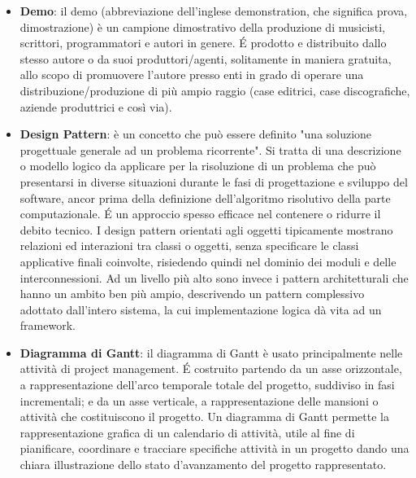 \begin{itemize}
\item[] \textbf{Demo}: il demo (abbreviazione dell'inglese demonstration, che significa prova, dimostrazione) è un campione dimostrativo della produzione di musicisti, scrittori, programmatori e autori in genere. \'E prodotto e distribuito dallo stesso autore o da suoi produttori/agenti, solitamente in maniera gratuita, allo scopo di promuovere l'autore presso enti in grado di operare una distribuzione/produzione di più ampio raggio (case editrici, case discografiche, aziende produttrici e così via).
\item[] \textbf{Design Pattern}: è un concetto che può essere definito "una soluzione progettuale generale ad un problema ricorrente". Si tratta di una descrizione o modello logico da applicare per la risoluzione di un problema che può presentarsi in diverse situazioni durante le fasi di progettazione e sviluppo del software, ancor prima della definizione dell'algoritmo risolutivo della parte computazionale. \'E un approccio spesso efficace nel contenere o ridurre il debito tecnico. I design pattern orientati agli oggetti tipicamente mostrano relazioni ed interazioni tra classi o oggetti, senza specificare le classi applicative finali coinvolte, risiedendo quindi nel dominio dei moduli e delle interconnessioni. Ad un livello più alto sono invece i pattern architetturali che hanno un ambito ben più ampio, descrivendo un pattern complessivo adottato dall'intero sistema, la cui implementazione logica dà vita ad un framework.
\item[] \textbf{Diagramma di Gantt}: il diagramma di Gantt è usato principalmente nelle attività di project management. É costruito partendo da un asse orizzontale, a rappresentazione  dell'arco temporale totale del progetto, suddiviso in fasi incrementali; e da un asse verticale, a rappresentazione delle mansioni o attività che costituiscono il progetto. Un diagramma di Gantt permette la rappresentazione grafica di un calendario di attività, utile al fine di pianificare, coordinare e tracciare specifiche attività in un progetto dando una chiara illustrazione dello stato d'avanzamento del progetto rappresentato.
\end{itemize}
\newpage

